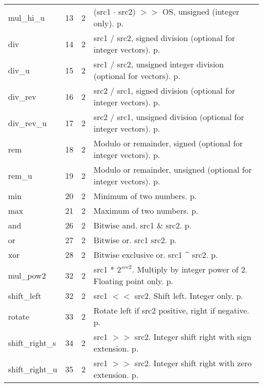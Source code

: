 \documentclass[forwardcom.tex]{subfiles}
\begin{document}
\begin{longtable} {|p{25mm}|p{12mm}|p{12mm}|p{100mm}|}
mul\_hi\_u   & 13 & 2 & (src1 $\cdot$ src2) $>>$ OS, unsigned (integer only). p. \pageref{table:mulHiUInstruction}\\
div          & 14 & 2 & src1 / src2, signed division (optional for integer vectors). p. \pageref{table:divInstruction} \\
div\_u       & 15 & 2 & src1 / src2, unsigned integer division (optional for vectors). p. \pageref{table:divUInstruction}\\
div\_rev     & 16 & 2 & src2 / src1, signed division (optional for integer vectors). p. \pageref{table:divRevInstruction} \\
div\_rev\_u  & 17 & 2 & src2 / src1, unsigned division (optional for integer vectors). p. \pageref{table:divRevUInstruction}\\
rem          & 18 & 2 & Modulo or remainder, signed (optional for integer vectors). p. \pageref{table:remInstruction}\\
rem\_u       & 19 & 2 & Modulo or remainder, unsigned (optional for integer vectors). p. \pageref{table:remUInstruction} \\
min          & 20 & 2 & Minimum of two numbers. p. \pageref{table:minInstruction} \\
max          & 21 & 2 & Maximum of two numbers. p. \pageref{table:maxInstruction}  \\
and          & 26 & 2 & Bitwise and. src1 \& src2. p. \pageref{table:andInstruction}\\
or           & 27 & 2 & Bitwise or. src1 \textbar{} src2. p. \pageref{table:orInstruction}\\
xor          & 28 & 2 & Bitwise exclusive or. src1 \^{} src2. p. \pageref{table:xorInstruction}\\
mul\_pow2    & 32 & 2 & src1 * $2^{src2}$. Multiply by integer power of 2. Floating point only. p. \pageref{table:mulPow2Instruction}\\
shift\_left  & 32 & 2 & src1 $<<$ src2. Shift left. Integer only. p. \pageref{table:shiftLeftInstruction}\\
rotate       & 33 & 2 & Rotate left if src2 positive, right if negative. p. \pageref{table:rotateInstruction}\\
shift\_right\_s & 34 & 2 & src1 $>>$ src2. Integer shift right with sign extension. p. \pageref{table:shiftRightSInstruction}\\
shift\_right\_u & 35 & 2 & src1 $>>$ src2. Integer shift right with zero extension. p. \pageref{table:shiftRightUInstruction}\\

\end{longtable}
\end{document}
